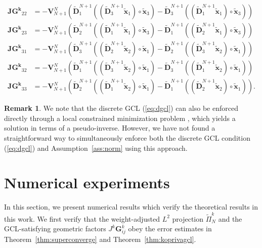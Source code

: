 \documentclass[preprint,10pt]{article}
\theoremstyle{definition}
\theoremstyle{lemma}
\newtheorem*{remark}{Remark}
\theoremstyle{theorem}
\theoremstyle{assumption}
\renewcommand{\tilde}{\widetilde}
\newcommand{\LRp}[1]{\left( #1 \right)}
\newcommand{\lcwnote}[1]{{\color{magenta}{#1}}}
\begin{document}
{\begin{align}
\bm{JG^k}_{22} &= -\bm{V}_{N+1}^N\LRp{\tilde{\bm{D}}^{N+1}_1 \LRp{ \LRp{\tilde{\bm{D}}^{N+1}_3\tilde{\bm{x}}_1} \circ\tilde{\bm{x}}_3} - \tilde{\bm{D}}^{N+1}_3 \LRp{ \LRp{\tilde{\bm{D}}^{N+1}_1\tilde{\bm{x}}_1 }\circ\tilde{\bm{x}}_3}} \nonumber\\
\bm{JG^k}_{23} &= -\bm{V}_{N+1}^N\LRp{\tilde{\bm{D}}^{N+1}_2 \LRp{ \LRp{\tilde{\bm{D}}^{N+1}_1\tilde{\bm{x}}_1} \circ\tilde{\bm{x}}_3} - \tilde{\bm{D}}^{N+1}_1 \LRp{ \LRp{\tilde{\bm{D}}^{N+1}_2\tilde{\bm{x}}_1 }\circ\tilde{\bm{x}}_3}} \nonumber\\
%
\bm{JG^k}_{31} &= -\bm{V}_{N+1}^N\LRp{\tilde{\bm{D}}^{N+1}_3 \LRp{ \LRp{\tilde{\bm{D}}^{N+1}_2 \tilde{\bm{x}}_2} \circ\tilde{\bm{x}}_1} - \tilde{\bm{D}}^{N+1}_2 \LRp{ \LRp{\tilde{\bm{D}}^{N+1}_3\tilde{\bm{x}}_2} \circ\tilde{\bm{x}}_1}} \nonumber\\
\bm{JG^k}_{32} &= -\bm{V}_{N+1}^N\LRp{\tilde{\bm{D}}^{N+1}_1 \LRp{ \LRp{\tilde{\bm{D}}^{N+1}_3\tilde{\bm{x}}_2} \circ\tilde{\bm{x}}_1} - \tilde{\bm{D}}^{N+1}_3 \LRp{  \LRp{\tilde{\bm{D}}^{N+1}_1\tilde{\bm{x}}_2 }\circ\tilde{\bm{x}}_1}} \nonumber\\
\bm{JG^k}_{33} &= -\bm{V}_{N+1}^N\LRp{\tilde{\bm{D}}^{N+1}_2 \LRp{ \LRp{\tilde{\bm{D}}^{N+1}_1\tilde{\bm{x}}_2} \circ\tilde{\bm{x}}_1} - \tilde{\bm{D}}^{N+1}_1 \LRp{  \LRp{\tilde{\bm{D}}^{N+1}_2\tilde{\bm{x}}_2 }\circ\tilde{\bm{x}}_1}}. \nonumber
\end{align}
\begin{remark}

We note that the discrete GCL (\ref{eq:dgcl}) can also be enforced directly through a local constrained minimization problem \cite{fernandez2016simultaneous, crean2018entropy}, which yields a solution in terms of a pseudo-inverse.  However, we have not found a straightforward way to simultaneously enforce both the discrete GCL condition (\ref{eq:dgcl}) and Assumption~\ref{ass:norm} using this approach.
\end{remark}


\section{Numerical experiments}
\label{sec:num}

In this section, we present numerical results which verify the theoretical results in this work.  We first verify that the weight-adjusted $L^2$ projection $\tilde{\Pi}^k_N$ and the GCL-satisfying geometric factors $J^k\bm{G}^k_{ij}$ obey the error estimates in Theorem~\ref{thm:superconverge} and Theorem~\ref{thm:koprivagcl}.  

}
\end{document}
